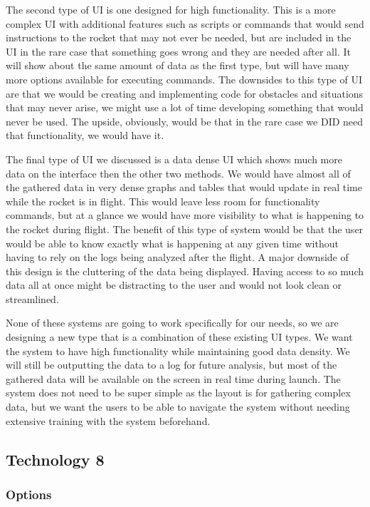 \documentclass[10pt,draftclsnofoot,onecolumn]{IEEEtran}
\begin{document}
	The second type of UI is one designed for high functionality. This is a more complex UI with additional features such as scripts or commands that would send instructions to the rocket that may not ever be needed, but are included in the UI in the rare case that something goes wrong and they are needed after all. It will show about the same amount of data as the first type, but will have many more options available for executing commands. The downsides to this type of UI are that we would be creating and implementing code for obstacles and situations that may never arise, we might use a lot of time developing something that would never be used. The upside, obviously, would be that in the rare case we DID need that functionality, we would have it. \par
	
	The final type of UI we discussed is a data dense UI which shows much more data on the interface then the other two methods. We would have almost all of the gathered data in very dense graphs and tables that would update in real time while the rocket is in flight. This would leave less room for functionality commands, but at a glance we would have more visibility to what is happening to the rocket during flight. The benefit of this type of system would be that the user would be able to know exactly what is happening at any given time without having to rely on the logs being analyzed after the flight. A major downside of this design is the cluttering of the data being displayed. Having access to so much data all at once might be distracting to the user and would not look clean or streamlined. \par

	None of these systems are going to work specifically for our needs, so we are designing a new type that is a combination of these existing UI types. We want the system to have high functionality while maintaining good data density. We will still be outputting the data to a log for future analysis, but most of the gathered data will be available on the screen in real time during launch. The system does not need to be super simple as the layout is for gathering complex data, but we want the users to be able to navigate the system without needing extensive training with the system beforehand. \par
\subsection{Technology 8}
\subsubsection{Options}
\end{document}
